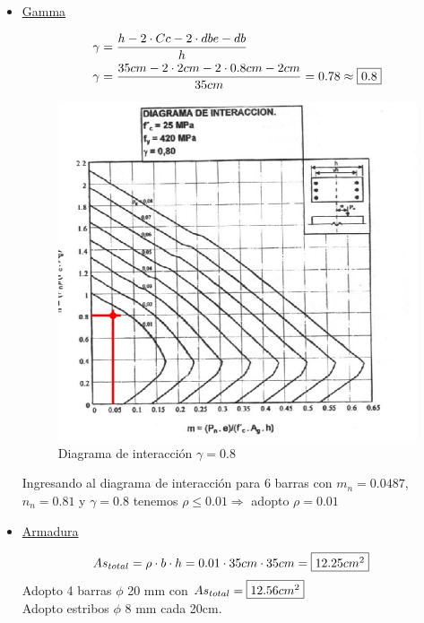 \begin{enumerate}
\begin{itemize}
\item \underline{Gamma}

\begin{align*}
& \gamma = \frac{h - 2 \cdot Cc - 2 \cdot dbe - db}{h} \\
& \gamma = \frac{35cm - 2 \cdot 2cm - 2 \cdot 0.8cm - 2cm}{35cm} = 0.78 \approx \framebox{0.8}
\end{align*}

\begin{figure}[H]
\begin{center}
	 \includegraphics[scale = 0.9]{chapters/chapter_1/images/figura2.png}
     \caption{Diagrama de interacción $\gamma = 0.8$}
\end{center}
\end{figure}
Ingresando al diagrama de interacción para 6 barras con $m_{n}=0.0487$, $n_{n}=0.81$ y $\gamma = 0.8$ tenemos $\rho \leq 0.01 \Rightarrow$ adopto $\rho=0.01$

\item \underline{Armadura}

\begin{align*}
& As_{total} = \rho \cdot b \cdot h = 0.01 \cdot 35cm \cdot 35cm = \framebox{$12.25cm^2$}
\end{align*}
Adopto 4 barras $\phi$ 20 mm con $As_{total}=\framebox{$12.56cm^2$}$\\
Adopto estribos $\phi$ 8 mm cada 20cm.\\


\end{itemize}
\end{enumerate}

